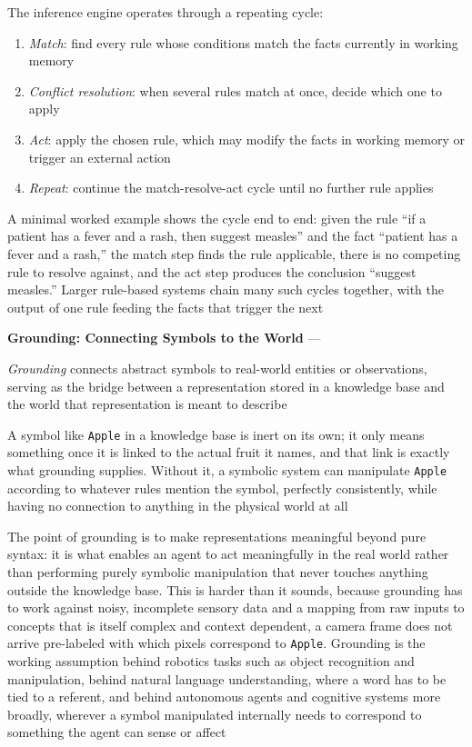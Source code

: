 The inference engine operates through a repeating cycle:
\begin{enumerate}
  \item \emph{Match}: find every rule whose conditions match the facts
    currently in working memory

  \item \emph{Conflict resolution}: when several rules match at once,
    decide which one to apply

  \item \emph{Act}: apply the chosen rule, which may modify the facts in
    working memory or trigger an external action

  \item \emph{Repeat}: continue the match-resolve-act cycle until no
    further rule applies
\end{enumerate}
A minimal worked example shows the cycle end to end: given the rule ``if a
patient has a fever and a rash, then suggest measles'' and the fact
``patient has a fever and a rash,'' the match step finds the rule
applicable, there is no competing rule to resolve against, and the act step
produces the conclusion ``suggest measles.'' Larger rule-based systems
chain many such cycles together, with the output of one rule feeding the
facts that trigger the next

\textbf{Grounding: Connecting Symbols to the World} --- \begin{definition}
  \emph{Grounding} connects abstract symbols to real-world entities or
  observations, serving as the bridge between a representation stored in a
  knowledge base and the world that representation is meant to describe
\end{definition}
A symbol like \texttt{Apple} in a knowledge base is inert on its own; it
only means something once it is linked to the actual fruit it names, and
that link is exactly what grounding supplies. Without it, a symbolic system
can manipulate \texttt{Apple} according to whatever rules mention the
symbol, perfectly consistently, while having no connection to anything in
the physical world at all

The point of grounding is to make representations meaningful beyond pure
syntax: it is what enables an agent to act meaningfully in the real world
rather than performing purely symbolic manipulation that never touches
anything outside the knowledge base. This is harder than it sounds, because
grounding has to work against noisy, incomplete sensory data and a mapping
from raw inputs to concepts that is itself complex and context dependent, a
camera frame does not arrive pre-labeled with which pixels correspond to
\texttt{Apple}. Grounding is the working assumption behind robotics tasks
such as object recognition and manipulation, behind natural language
understanding, where a word has to be tied to a referent, and behind
autonomous agents and cognitive systems more broadly, wherever a symbol
manipulated internally needs to correspond to something the agent can
sense or affect

